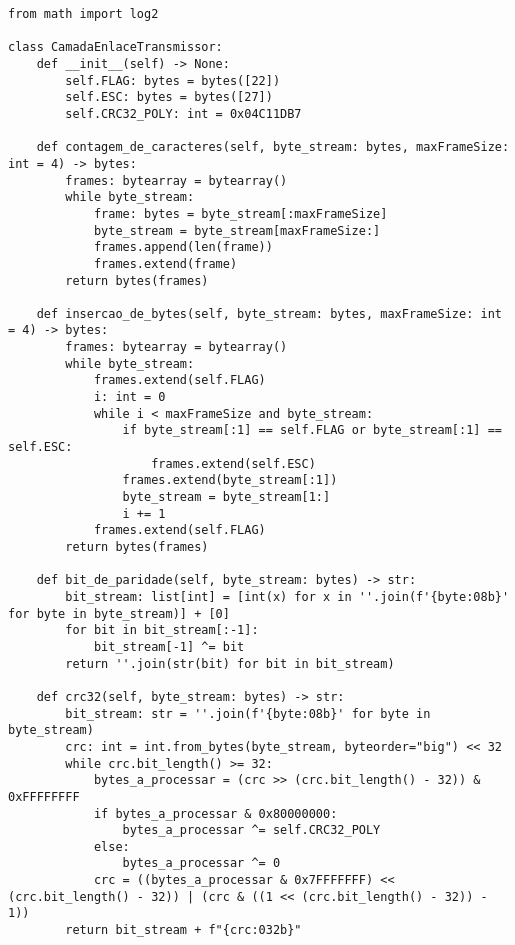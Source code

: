 \documentclass[12pt, a4paper]{article}
\newenvironment{code}{\captionsetup{type=listing}}{}
\begin{document}
\begin{code}
\begin{verbatim}
from math import log2

class CamadaEnlaceTransmissor:
    def __init__(self) -> None:
        self.FLAG: bytes = bytes([22])
        self.ESC: bytes = bytes([27])
        self.CRC32_POLY: int = 0x04C11DB7
    
    def contagem_de_caracteres(self, byte_stream: bytes, maxFrameSize: int = 4) -> bytes:
        frames: bytearray = bytearray()
        while byte_stream:
            frame: bytes = byte_stream[:maxFrameSize]
            byte_stream = byte_stream[maxFrameSize:]
            frames.append(len(frame))
            frames.extend(frame)
        return bytes(frames)
    
    def insercao_de_bytes(self, byte_stream: bytes, maxFrameSize: int = 4) -> bytes:
        frames: bytearray = bytearray()
        while byte_stream:
            frames.extend(self.FLAG)
            i: int = 0
            while i < maxFrameSize and byte_stream:
                if byte_stream[:1] == self.FLAG or byte_stream[:1] == self.ESC:
                    frames.extend(self.ESC)
                frames.extend(byte_stream[:1])
                byte_stream = byte_stream[1:]
                i += 1
            frames.extend(self.FLAG)
        return bytes(frames)
    
    def bit_de_paridade(self, byte_stream: bytes) -> str:
        bit_stream: list[int] = [int(x) for x in ''.join(f'{byte:08b}' for byte in byte_stream)] + [0]
        for bit in bit_stream[:-1]:
            bit_stream[-1] ^= bit
        return ''.join(str(bit) for bit in bit_stream)
    
    def crc32(self, byte_stream: bytes) -> str:
        bit_stream: str = ''.join(f'{byte:08b}' for byte in byte_stream)
        crc: int = int.from_bytes(byte_stream, byteorder="big") << 32
        while crc.bit_length() >= 32:
            bytes_a_processar = (crc >> (crc.bit_length() - 32)) & 0xFFFFFFFF
            if bytes_a_processar & 0x80000000:
                bytes_a_processar ^= self.CRC32_POLY
            else:
                bytes_a_processar ^= 0
            crc = ((bytes_a_processar & 0x7FFFFFFF) << (crc.bit_length() - 32)) | (crc & ((1 << (crc.bit_length() - 32)) - 1))
        return bit_stream + f"{crc:032b}"
    

\end{verbatim}
\end{code}
\end{document}
